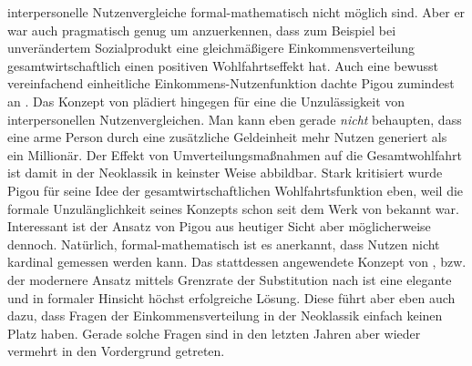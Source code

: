interpersonelle Nutzenvergleiche formal-mathematisch nicht möglich sind. Aber er war auch pragmatisch genug um anzuerkennen, dass zum Beispiel bei unverändertem Sozialprodukt eine gleichmäßigere Einkommensverteilung gesamtwirtschaftlich einen positiven Wohlfahrtseffekt hat. Auch eine bewusst vereinfachend einheitliche Einkommens-Nutzenfunktion dachte Pigou zumindest an \parencite[S. 237]{Pigou1920}. Das Konzept von \textcite{Pareto1906} plädiert hingegen für eine die Unzulässigkeit von interpersonellen Nutzenvergleichen. Man kann eben gerade \textit{nicht} behaupten, dass eine arme Person durch eine zusätzliche Geldeinheit mehr Nutzen generiert als ein Millionär. Der Effekt von Umverteilungsmaßnahmen auf die Gesamtwohlfahrt ist damit in der Neoklassik in keinster Weise abbildbar. Stark kritisiert \parencite[S. 123]{Robbins1932} wurde Pigou für seine Idee der gesamtwirtschaftlichen Wohlfahrtsfunktion eben, weil die formale Unzulänglichkeit seines Konzepts schon seit dem Werk von \textcite{Pareto1906} bekannt war. Interessant ist der Ansatz von Pigou aus heutiger Sicht aber möglicherweise dennoch. Natürlich, formal-mathematisch ist es anerkannt, dass Nutzen nicht kardinal gemessen werden kann. Das stattdessen angewendete  Konzept von \textcite{Pareto1906}, bzw. der modernere Ansatz mittels Grenzrate der Substitution nach \textcite{Hicks1934b} ist eine elegante und in formaler Hinsicht höchst erfolgreiche Lösung. Diese führt aber eben auch dazu, dass Fragen der Einkommensverteilung in der Neoklassik einfach keinen Platz haben. Gerade solche Fragen sind in den letzten Jahren aber wieder vermehrt in den Vordergrund getreten.

